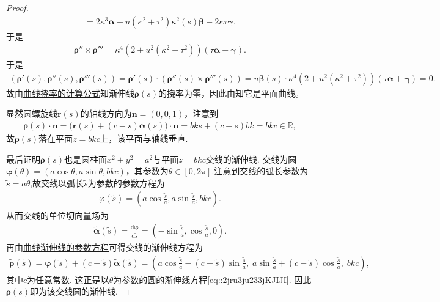 \documentclass[../../main.tex]{subfiles}%
\begin{document}
\begin{proof}
\begin{gather*}
=2\kappa^3\bm{\alpha}-u(\kappa^2+\tau^2)\kappa^2(s)\bm{\beta}-2\kappa\tau\bm{\gamma}.
\end{gather*}
于是
\begin{align*}
\bm{\rho}''\times\bm{\rho}''' = \kappa^4\!\left(2+u^2(\kappa^2+\tau^2)\right)(\tau\bm{\alpha}+\bm{\gamma}).
\end{align*}
于是
\begin{align*}
\left( \boldsymbol{\rho }' \left( s \right) ,\boldsymbol{\rho }'' \left( s \right) ,\boldsymbol{\rho }''' \left( s \right) \right) =\boldsymbol{\rho }' \left( s \right) \cdot \left( \boldsymbol{\rho }'' \left( s \right) \times \boldsymbol{\rho }''' \left( s \right) \right) =u\boldsymbol{\beta }\left( s \right) \cdot \kappa ^4\!\left( 2+u^2(\kappa ^2+\tau ^2) \right) (\tau \boldsymbol{\alpha }+\boldsymbol{\gamma })=0.
\end{align*}
故由\hyperref[theorem:微分几何-曲线挠率的计算公式]{曲线挠率的计算公式}知渐伸线$\bm{\rho}(s)$的挠率为零，因此由知它是平面曲线。

显然圆螺旋线$\bm{r}(s)$的轴线方向为$\bm{n}=(0,0,1)$，注意到
\begin{align*}
\bm{\rho}(s)\cdot\bm{n}= \bigl(\bm{r}(s)+(c-s)\bm{\alpha}(s)\bigr)\cdot\bm{n}=bks+(c-s)bk=bkc\in \mathbb{R},
\end{align*}
故$\bm{\rho}(s)$落在平面$z=bkc$上，该平面与轴线垂直.

最后证明$\bm{\rho}(s)$也是圆柱面$x^2+y^2=a^2$与平面$z=bkc$交线的渐伸线. 交线为圆$\bm{\varphi}(\theta)=(a\cos\theta,a\sin\theta,bkc)$，其参数为$\theta\in [0,2\pi]$.注意到交线的弧长参数为$\tilde{s}=a\theta$,故交线以弧长$\tilde{s}$为参数的参数方程为
\begin{align*}
\varphi(\tilde{s})=(a\cos\frac{\tilde{s}}{a},a\sin\frac{\tilde{s}}{a},bkc).
\end{align*}
从而交线的单位切向量场为
\begin{align*}
\tilde{\bm{\alpha}}(\tilde{s})=\frac{\mathrm{d}\boldsymbol{\varphi }}{\mathrm{d}\tilde{s}}=(-\sin\frac{\tilde{s}}{a},\cos\frac{\tilde{s}}{a},0).
\end{align*}
再由\hyperref[theorem:微分几何-定理7.3]{曲线渐伸线的参数方程}可得交线的渐伸线方程为
\begin{align*}
\tilde{\bm{\rho}}(\tilde{s}) = \bm{\varphi}(\tilde{s}) + (c-\tilde{s})\tilde{\bm{\alpha}}(\tilde{s})
= \left(a\cos\frac{\tilde{s}}{a}-(c-\tilde{s})\sin\frac{\tilde{s}}{a},\; a\sin\frac{\tilde{s}}{a}+(c-\tilde{s})\cos\frac{\tilde{s}}{a},\; bkc\right),
\end{align*}
其中$c$为任意常数.
这正是以$\theta$为参数的圆的渐伸线方程\eqref{eq::2jru3ju233jKJIJI}. 因此$\bm{\rho}(s)$即为该交线圆的渐伸线.

\end{proof}
\end{document}
